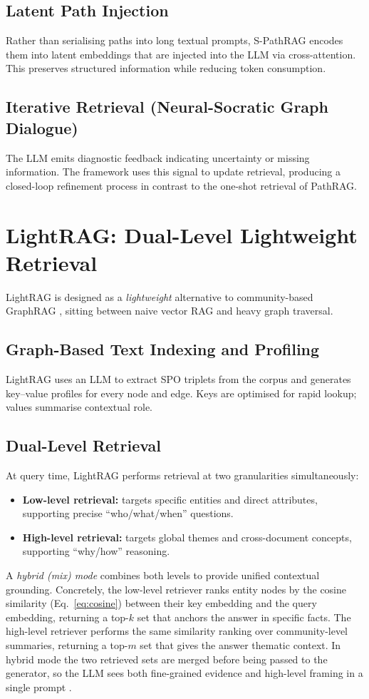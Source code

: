 \documentclass[12pt,a4paper,oneside]{report}
\begin{document}
\subsection{Latent Path Injection}
Rather than serialising paths into long textual prompts, S-PathRAG encodes
them into latent embeddings that are injected into the LLM via
cross-attention. This preserves structured information while reducing token
consumption.

\subsection{Iterative Retrieval (Neural-Socratic Graph Dialogue)}
The LLM emits diagnostic feedback indicating uncertainty or missing
information. The framework uses this signal to update retrieval, producing a
closed-loop refinement process in contrast to the one-shot retrieval of
PathRAG.

\section{LightRAG: Dual-Level Lightweight Retrieval}

LightRAG is designed as a \emph{lightweight} alternative to community-based
GraphRAG \citep{guo2025lightrag}, sitting between naive vector RAG and heavy
graph traversal.

\subsection{Graph-Based Text Indexing and Profiling}
LightRAG uses an LLM to extract SPO triplets from the corpus and generates
key--value profiles for every node and edge. Keys are optimised for rapid
lookup; values summarise contextual role.

\subsection{Dual-Level Retrieval}
At query time, LightRAG performs retrieval at two granularities
simultaneously:
\begin{itemize}[leftmargin=2em,itemsep=2pt]
    \item \textbf{Low-level retrieval:} targets specific entities and direct
          attributes, supporting precise ``who/what/when'' questions.
    \item \textbf{High-level retrieval:} targets global themes and
          cross-document concepts, supporting ``why/how'' reasoning.
\end{itemize}
A \emph{hybrid (mix) mode} combines both levels to provide unified
contextual grounding. Concretely, the low-level retriever ranks
entity nodes by the cosine similarity (Eq.~\eqref{eq:cosine}) between
their key embedding and the query embedding, returning a top-$k$ set
that anchors the answer in specific facts. The high-level retriever
performs the same similarity ranking over community-level summaries,
returning a top-$m$ set that gives the answer thematic context. In
hybrid mode the two retrieved sets are merged before being passed to
the generator, so the LLM sees both fine-grained evidence and
high-level framing in a single prompt
\citep{guo2025lightrag}.
\end{document}
